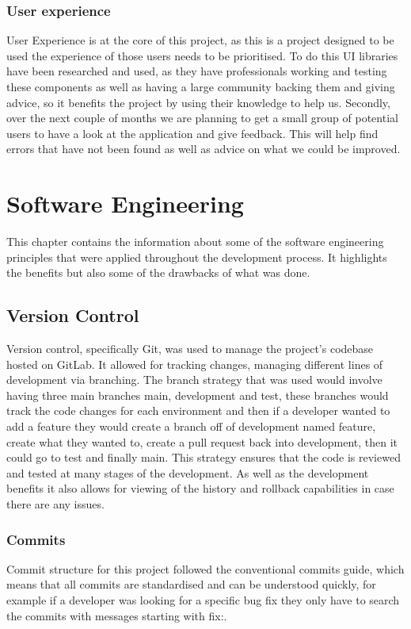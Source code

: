 \documentclass[]{project_report}
\begin{document}
\subsection{User experience}

User Experience is at the core of this project, as this is a project designed to be used the experience of those users needs to be prioritised. To do this UI libraries have been researched and used, as they have professionals working and testing these components as well as having a large community backing them and giving advice, so it benefits the project by using their knowledge to help us. Secondly, over the next couple of months we are planning to get a small group of potential users to have a look at the application and give feedback. This will help find errors that have not been found as well as advice on what we could be improved. 

\chapter{Software Engineering}
\label{chapter:software}

This chapter contains the information about some of the software engineering principles that were applied throughout the development process. It highlights the benefits but also some of the drawbacks of what was done.

\section{Version Control}

Version control, specifically Git, was used to manage the project's codebase hosted on GitLab. It allowed for tracking changes, managing different lines of development via branching. The branch strategy that was used would involve having three main branches main, development and test, these branches would track the code changes for each environment and then if a developer wanted to add a feature they would create a branch off of development named feature, create what they wanted to, create a pull request back into development, then it could go to test and finally main. This strategy ensures that the code is reviewed and tested at many stages of the development. As well as the development benefits it also allows for viewing of the history and rollback capabilities in case there are any issues.

\subsection{Commits}
Commit structure for this project followed the conventional commits guide, which means that all commits are standardised and can be understood quickly, for example if a developer was looking for a specific bug fix they only have to search the commits with messages starting with fix:.
\end{document}
